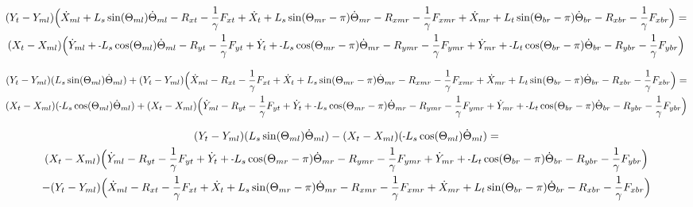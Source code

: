 \documentclass[11pt, landscape]{article}
\newcommand{\mn}{\scalebox{0.7}[1.0]{-}}
\begin{document}
\begin{multline}
(Y_{t } - Y_{ml}) \Big( \dot{X}_{ml} + L_{s}\sin(\Theta_{ml}) \dot{\Theta}_{ml} - R_{xt } - \frac{1}{\gamma}F_{xt } + \dot{X}_{t } + L_{s}\sin(\Theta_{mr}-\pi)  \dot{\Theta}_{mr}
- R_{xmr} - \frac{1}{\gamma}F_{xmr} + \dot{X}_{mr} + L_{t}\sin(\Theta_{br}-\pi)  \dot{\Theta}_{br} - R_{xbr} - \frac{1}{\gamma}F_{xbr} \Big) = \\
(X_{t } - X_{ml}) \Big( \dot{Y}_{ml} + \mn L_{s}\cos(\Theta_{ml}) \dot{\Theta}_{ml} - R_{yt} - \frac{1}{\gamma}F_{yt } + \dot{Y}_{t } + \mn L_{s}\cos(\Theta_{mr}-\pi)  \dot{\Theta}_{mr}
- R_{ymr} - \frac{1}{\gamma}F_{ymr} + \dot{Y}_{mr} + \mn L_{t}\cos(\Theta_{br}-\pi)  \dot{\Theta}_{br} - R_{ybr} - \frac{1}{\gamma}F_{ybr}\Big)
\end{multline}

\begin{multline}
(Y_{t } - Y_{ml})(L_{s}\sin(\Theta_{ml}) \dot{\Theta}_{ml}) + (Y_{t } - Y_{ml})\Big( \dot{X}_{ml} - R_{xt } - \frac{1}{\gamma}F_{xt } + \dot{X}_{t } + L_{s}\sin(\Theta_{mr}-\pi)  \dot{\Theta}_{mr}
- R_{xmr} - \frac{1}{\gamma}F_{xmr} + \dot{X}_{mr} + L_{t}\sin(\Theta_{br}-\pi)  \dot{\Theta}_{br} - R_{xbr} - \frac{1}{\gamma}F_{xbr} \Big) = \\
(X_{t } - X_{ml})(\mn L_{s}\cos(\Theta_{ml}) \dot{\Theta}_{ml}) + (X_{t } - X_{ml}) \Big( \dot{Y}_{ml} - R_{yt} - \frac{1}{\gamma}F_{yt } + \dot{Y}_{t } + \mn L_{s}\cos(\Theta_{mr}-\pi)  \dot{\Theta}_{mr}
- R_{ymr} - \frac{1}{\gamma}F_{ymr} + \dot{Y}_{mr} + \mn L_{t}\cos(\Theta_{br}-\pi)  \dot{\Theta}_{br} - R_{ybr} - \frac{1}{\gamma}F_{ybr}\Big)
\end{multline}

\begin{multline}
(Y_{t } - Y_{ml})(L_{s}\sin(\Theta_{ml}) \dot{\Theta}_{ml}) - (X_{t } - X_{ml})(\mn L_{s}\cos(\Theta_{ml}) \dot{\Theta}_{ml}) = \\
(X_{t } - X_{ml}) \Big( \dot{Y}_{ml} - R_{yt} - \frac{1}{\gamma}F_{yt } + \dot{Y}_{t } + \mn L_{s}\cos(\Theta_{mr}-\pi)  \dot{\Theta}_{mr}
- R_{ymr} - \frac{1}{\gamma}F_{ymr} + \dot{Y}_{mr} + \mn L_{t}\cos(\Theta_{br}-\pi)  \dot{\Theta}_{br} - R_{ybr} - \frac{1}{\gamma}F_{ybr}\Big) \\
- (Y_{t } - Y_{ml})\Big( \dot{X}_{ml} - R_{xt } - \frac{1}{\gamma}F_{xt } + \dot{X}_{t } + L_{s}\sin(\Theta_{mr}-\pi)  \dot{\Theta}_{mr}
- R_{xmr} - \frac{1}{\gamma}F_{xmr} + \dot{X}_{mr} + L_{t}\sin(\Theta_{br}-\pi)  \dot{\Theta}_{br} - R_{xbr} - \frac{1}{\gamma}F_{xbr} \Big)
\end{multline}
\end{document}
